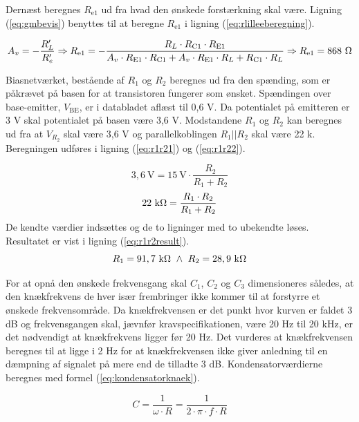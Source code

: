 Dernæst beregnes $R_{\mathrm{e1}}$ ud fra hvad den ønskede forstærkning skal være. Ligning (\ref{eq:gmbevis}) benyttes til at beregne $R_{\mathrm{e1}}$ i ligning (\ref{eq:rlilleeberegning}).

\begin{equation}
\label{eq:rlilleeberegning}
A_v = -\frac{R'_L}{R'_e} \Rightarrow  R_{\mathrm{e1}} =-\frac{R_L \cdot R_{\mathrm{C1}} \cdot R_{\mathrm{E1}}}{A_v \cdot R_{\mathrm{E1}} \cdot R_{\mathrm{C1}} + A_v \cdot R_{\mathrm{E1}} \cdot R_L + R_{\mathrm{C1}} \cdot R_L} \Rightarrow R_{\mathrm{e1}} = 868~\ohm
\end{equation}

Biasnetværket, bestående af $R_1$ og $R_2$ beregnes ud fra den spænding, som er påkrævet på basen for at transistoren fungerer som ønsket. Spændingen over base-emitter, $V_{\mathrm{BE}}$, er i databladet aflæst til 0,6 V. Da potentialet på emitteren er 3 V skal potentialet på basen være 3,6 V. Modstandene $R_1$ og $R_2$ kan beregnes ud fra at $V_{R_2}$ skal være 3,6 V og parallelkoblingen $R_1||R_2$ skal være 22 k\ohm. Beregningen udføres i ligning (\ref{eq:r1r21}) og (\ref{eq:r1r22}).

\begin{equation}
\mathrm{3,6~V} = \mathrm{15~V} \cdot \frac{R_2}{R_1+R_2} 
\label{eq:r1r21}
\end{equation}
\begin{equation}
22~\mathrm{k\ohm} = \frac{R_1 \cdot R_2}{R_1 + R_2}
\label{eq:r1r22}
\end{equation}
De kendte værdier indsættes og de to ligninger med to ubekendte løses. Resultatet er vist i ligning (\ref{eq:r1r2result}).
\begin{equation}
R_1 = 91,7~\mathrm{k}\ohm ~ \wedge ~ R_2=28,9~\mathrm{k}\ohm
\label{eq:r1r2result}
\end{equation}

For at opnå den ønskede frekvensgang skal $C_1$, $C_2$ og $C_3$ dimensioneres således, at den knækfrekvens de hver især frembringer ikke kommer til at forstyrre et ønskede frekvensområde. Da knækfrekvensen er det punkt hvor kurven er faldet 3 dB og frekvensgangen skal, jævnfør kravspecifikationen, være 20 Hz til 20 kHz, er det nødvendigt at knækfrekvens  ligger før 20 Hz. Det vurderes at knækfrekvensen beregnes til at ligge i 2 Hz for at knækfrekvensen ikke giver anledning til en dæmpning af signalet på mere end de tilladte 3 dB. Kondensatorværdierne beregnes med formel (\ref{eq:kondensatorknaek}).

\begin{equation}
C=\frac{1}{\omega \cdot R}=\frac{1}{2\cdot \pi \cdot f \cdot R}
\label{eq:kondensatorknaek}
\end{equation}

